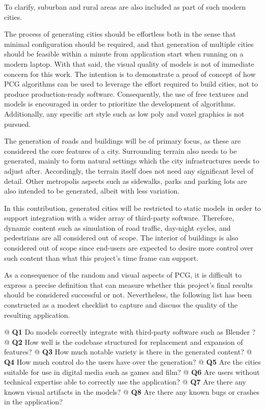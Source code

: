 To clarify, suburban and rural areas are also included as part of such modern cities.

The process of generating cities should be effortless both in the sense that minimal configuration should be required, and that generation of multiple cities should be feasible within a minute from application start when running on a modern laptop.
With that said, the visual quality of models is not of immediate concern for this work.
The intention is to demonstrate a proof of concept of how PCG algorithms can be used to leverage the effort required to build cities, not to produce production-ready software.
Consequently, the use of free textures and models is encouraged in order to prioritize the development of algorithms.
Additionally, any specific art style such as low poly \cite{lowpoly_wiki} and voxel graphics \cite{voxels_wiki} is not pursued.

The generation of roads and buildings will be of primary focus, as these are considered the core features of a city.
Surrounding terrain also needs to be generated, mainly to form natural settings which the city infrastructures needs to adjust after.
Accordingly, the terrain itself does not need any significant level of detail.
Other metropolis aspects such as sidewalks, parks and parking lots are also intended to be generated, albeit with less variation.

In this contribution, generated cities will be restricted to static models in order to support integration with a wider array of third-party software.
Therefore, dynamic content such as simulation of road traffic, day-night cycles, and pedestrians are all considered out of scope.
The interior of buildings is also considered out of scope since end-users are expected to desire more control over such content than what this project's time frame can support.

As a consequence of the random and visual aspects of PCG, it is difficult to express a precise definition that can measure whether this project's final results should be considered successful or not.
Nevertheless, the following list has been constructed as a modest checklist to capture and discuss the quality of the resulting application.

\begin{easylist}
  @ \textbf{Q1} Do models correctly integrate with third-party software such as Blender \cite{blender}?
  @ \textbf{Q2} How well is the codebase structured for replacement and expansion of features?
  @ \textbf{Q3} How much notable variety is there in the generated content?
  @ \textbf{Q4} How much control do the users have over the generation?
  @ \textbf{Q5} Are the cities suitable for use in digital media such as games and film?
  @ \textbf{Q6} Are users without technical expertise able to correctly use the application?
  @ \textbf{Q7} Are there any known visual artifacts in the models?
  @ \textbf{Q8} Are there any known bugs or crashes in the application?
\end{easylist}